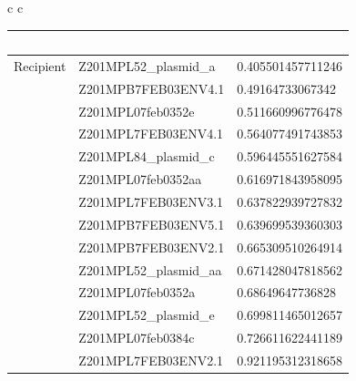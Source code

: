 \documentclass[conference]{IEEEtran}
\begin{document}
\begin{table}[]
\begin{tabular}{ c c}
\begin{tabular}{l l l}
	& \ &\ \\
	\hline
Recipient &	Z201MPL52\_plasmid\_a	&	0.405501457711246	\\
&	Z201MPB7FEB03ENV4.1	&	0.49164733067342	\\
&	Z201MPL07feb0352e	&	0.511660996776478	\\
&	Z201MPL7FEB03ENV4.1	&	0.564077491743853	\\
&	Z201MPL84\_plasmid\_c	&	0.596445551627584	\\
&	Z201MPL07feb0352aa	&	0.616971843958095	\\
&	Z201MPL7FEB03ENV3.1	&	0.637822939727832	\\
&	Z201MPB7FEB03ENV5.1	&	0.639699539360303	\\
&	Z201MPB7FEB03ENV2.1	&	0.665309510264914	\\
&	Z201MPL52\_plasmid\_aa	&	0.671428047818562	\\
&	Z201MPL07feb0352a	&	0.68649647736828	\\
&	Z201MPL52\_plasmid\_e	&	0.699811465012657	\\
&	Z201MPL07feb0384c	&	0.726611622441189	\\
&	Z201MPL7FEB03ENV2.1	&	0.921195312318658	\\


\end{tabular}
\end{tabular}
\end{table}
\end{document}
